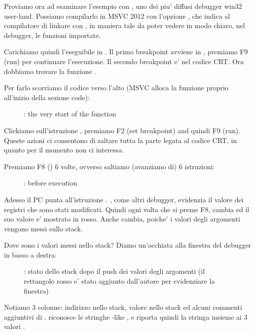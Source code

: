 Proviamo ora ad esaminare l'esempio con \olly, uno dei piu' diffusi debugger win32 user-land.
Possiamo compilarlo in MSVC 2012 con l'opzione , che indica al compilatore di linkare con ,
in maniera tale da poter vedere in modo chiaro, nel debugger, le funzioni importate.

Carichiamo quindi l'eseguibile in \olly.
Il primo breakpoint avviene in , premiamo F9 (run) per continuare l'esecuzione. 
Il secondo breakpoint e' nel codice \ac{CRT}.
Ora dobbiamo trovare la funzione \main.

Per farlo scorriamo il codice verso l'alto (MSVC alloca la funzione \main proprio all'inizio della sezione code): 
\begin{figure}[H]
\centering
{}
\caption{\olly: the very start of the \main function}
\label{fig:printf3_olly_1}
\end{figure}

Clickiamo sull'istruzione , premiamo F2 (set breakpoint) and quindi F9 (run).
Queste azioni ci consentono di saltare tutta la parte legata al codice \ac{CRT}, in quanto per il momento non ci interessa.

\clearpage
Premiamo F8 (\stepover) 6 volte, ovverso saltiamo (avanziamo di) 6 istruzioni:

\begin{figure}[H]
\centering
{}
\caption{\olly: before \printf execution}
\label{fig:printf3_olly_2}
\end{figure}

Adesso il \ac{PC} punta all'istruzione .
\olly, come altri debugger, evidenzia il valore dei registri che sono stati modificati.
Quindi ogni volta che si preme F8, \EIP cambia ed il suo valore e' mostrato in rosso.
Anche \ESP cambia, poiche' i valori degli argomenti vengono messi sullo stack.

Dove sono i valori messi nello stack?
Diamo un'occhiata alla finestra del debugger in basso a destra:

\begin{figure}[H]
\centering
{}
\caption{\olly: stato dello stack dopo il push dei valori degli argomenti (il rettangolo rosso e' stato aggiunto dall'autore per evidenziare la finestra)}
\end{figure}

Notiamo 3 colonne: indirizzo nello stack, valore nello stack ed alcuni commenti aggiuntivi di \olly. 
\olly riconosce le stringhe \printf{}-like , e riporta quindi la stringa insieme ai 3 valori .

